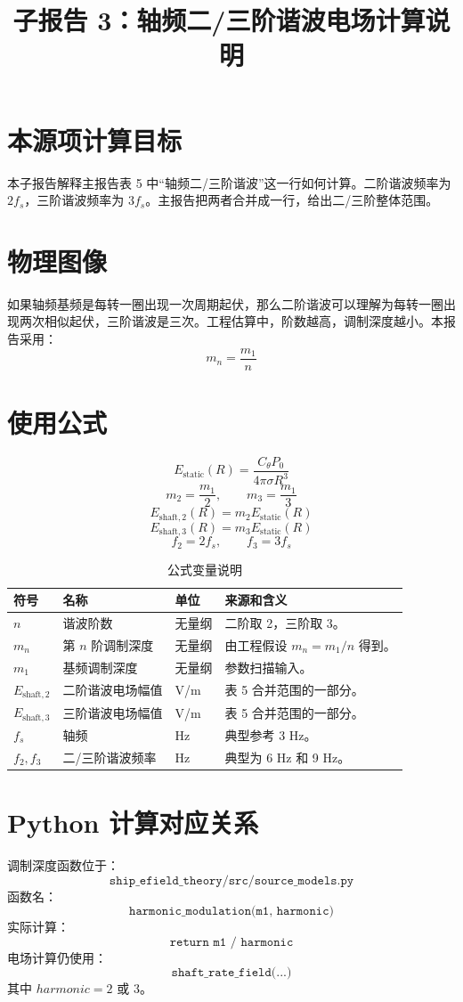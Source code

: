 \documentclass[UTF8,a4paper,11pt]{ctexart}
\title{子报告 3：轴频二/三阶谐波电场计算说明}
\author{}
\date{}
\begin{document}
\maketitle

\section{本源项计算目标}
本子报告解释主报告表 5 中“轴频二/三阶谐波”这一行如何计算。二阶谐波频率为 $2f_s$，三阶谐波频率为 $3f_s$。主报告把两者合并成一行，给出二/三阶整体范围。

\section{物理图像}
如果轴频基频是每转一圈出现一次周期起伏，那么二阶谐波可以理解为每转一圈出现两次相似起伏，三阶谐波是三次。工程估算中，阶数越高，调制深度越小。本报告采用：
\[
m_n=\frac{m_1}{n}
\]

\section{使用公式}
\[
E_{\mathrm{static}}(R)=\frac{C_\theta P_0}{4\pi\sigma R^3}
\]
\[
m_2=\frac{m_1}{2},\qquad m_3=\frac{m_1}{3}
\]
\[
E_{\mathrm{shaft},2}(R)=m_2E_{\mathrm{static}}(R)
\]
\[
E_{\mathrm{shaft},3}(R)=m_3E_{\mathrm{static}}(R)
\]
\[
f_2=2f_s,\qquad f_3=3f_s
\]

\begin{longtable}{p{2.7cm}p{3.3cm}p{2.0cm}p{5.4cm}}
\caption{公式变量说明}\\
\toprule
符号 & 名称 & 单位 & 来源和含义\\
\midrule
$n$ & 谐波阶数 & 无量纲 & 二阶取 2，三阶取 3。\\
$m_n$ & 第 $n$ 阶调制深度 & 无量纲 & 由工程假设 $m_n=m_1/n$ 得到。\\
$m_1$ & 基频调制深度 & 无量纲 & 参数扫描输入。\\
$E_{\mathrm{shaft},2}$ & 二阶谐波电场幅值 & V/m & 表 5 合并范围的一部分。\\
$E_{\mathrm{shaft},3}$ & 三阶谐波电场幅值 & V/m & 表 5 合并范围的一部分。\\
$f_s$ & 轴频 & Hz & 典型参考 3 Hz。\\
$f_2,f_3$ & 二/三阶谐波频率 & Hz & 典型为 6 Hz 和 9 Hz。\\
\bottomrule
\end{longtable}

\section{Python 计算对应关系}
调制深度函数位于：
\[
\texttt{ship\_efield\_theory/src/source\_models.py}
\]
函数名：
\[
\texttt{harmonic\_modulation(m1, harmonic)}
\]
实际计算：
\[
\texttt{return m1 / harmonic}
\]
电场计算仍使用：
\[
\texttt{shaft\_rate\_field(...)}
\]
其中 $harmonic=2$ 或 $3$。
\end{document}
